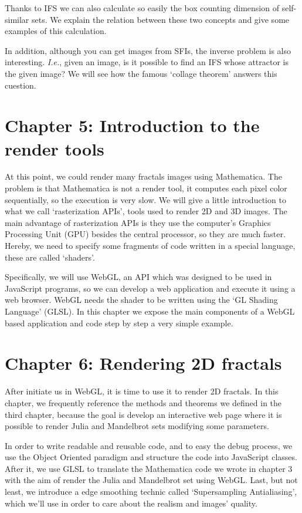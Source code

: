Thanks to IFS we can also calculate so easily the box counting dimension of self-similar sets. We explain the relation between these two concepts and give some examples of this calculation.

In addition, although you can get images from SFIs, the inverse problem is also interesting. \textit{I.e.}, given an image, is it possible to find an IFS whose attractor is the given image? We will see how the famous `collage theorem' answers this cuestion.

\section*{Chapter 5: Introduction to the render tools}

At this point, we could render many fractals images using Mathematica. The problem is that Mathematica is not a render tool, it computes each pixel color sequentially, so the execution is very slow. We will give a little introduction to what we call `rasterization APIs', tools used to render 2D and 3D images. The main advantage of rasterization APIs is they use the computer's Graphics Processing Unit (GPU) besides the central processor, so they are much faster. Hereby, we need to specify some fragments of code written in a special language, these are called `shaders'. 

Specifically, we will use WebGL, an API which was designed to be used in JavaScript programs, so we can develop a web application and execute it using a web browser. WebGL needs the shader to be written using the `GL Shading Language' (GLSL). In this chapter we expose the main components of a WebGL based application and code step by step a very simple example.

\section*{Chapter 6: Rendering 2D fractals}

After initiate us in WebGL, it is time to use it to render 2D fractals. In this chapter, we frequently reference the methods and theorems we defined in the third chapter, because the goal is develop an interactive web page where it is possible to render Julia and Mandelbrot sets modifying some parameters.

In order to write readable and reusable code, and to easy the debug process, we use the Object Oriented paradigm and structure the code into JavaScript classes. After it, we use GLSL to translate the Mathematica code we wrote in chapter 3 with the aim of render the Julia and Mandelbrot set using WebGL. Last, but not least, we introduce a edge smoothing technic called `Supersampling Antialiasing', which we'll use in order to care about the realism and images' quality.

